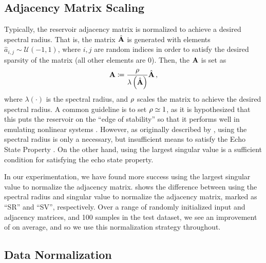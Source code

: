 \subsection{Adjacency Matrix Scaling}

Typically, the reservoir adjacency matrix is normalized to achieve a desired
spectral radius.
That is, the matrix $\hat{\mathbf{A}}$ is generated with elements
$\hat{a}_{i,j} \sim \mathcal{U}(-1,1)$, where $i,j$ are random indices in order
to satisfy the desired sparsity of the matrix (all other elements are 0).
Then, the $\mathbf{A}$ is set as
\begin{equation*}
    \mathbf{A} \coloneqq
    \dfrac{\rho}{\lambda\left(\hat{\mathbf{A}}\right)}
    \hat{\mathbf{A}} \, ,
\end{equation*}
where $\lambda\left(\cdot\right)$ is the spectral radius, and $\rho$
scales the matrix to achieve the desired spectral radius.
A common guideline is to set $\rho \simeq 1$, as it is hypothesized
that this puts the reservoir on the ``edge of stability'' so that it performs
well in emulating nonlinear systems .
However, as originally described by \citet{jaeger_echo_2001},
using the spectral radius is only a necessary, but insufficient means to satisfy
the Echo State Property .
On the other hand, using the largest singular value is a sufficient condition
for satisfying the echo state property.

In our experimentation, we have found more success using the largest singular
value to normalize the adjacency matrix.
 shows the difference between using the spectral radius and
singular value to normalize the adjacency matrix, marked as ``SR'' and
``SV'', respectively.
Over a range of randomly initialized input and adjacency matrices, and 100
samples in the test dataset, we see an improvement of  on
average, and so we use this normalization strategy throughout.

\subsection{Data Normalization}
\label{subsec:data_normalization}


